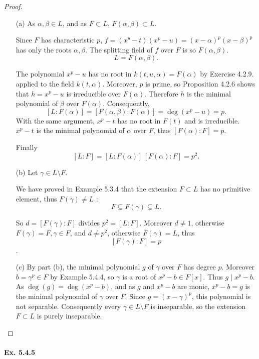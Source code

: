 \documentclass[11pt,a4paper]{article}
\begin{document}
\begin{proof}

\begin{enumerate}
\item[(a)]
As $\alpha,\beta\in L$, and as $F\subset L$, $F(\alpha,\beta)\subset L$.

Since $F$ has characteristic $p$, $f=(x^p-t)(x^p-u)  = (x-\alpha)^p(x-\beta)^p$ has only the roots $\alpha,\beta$. The splitting field of $f$ over $F$ is so $F(\alpha,\beta)$.
$$L = F(\alpha,\beta).$$

The polynomial $x^p -u$ has no root in  $k(t,u,\alpha) = F(\alpha)$ by Exercise 4.2.9. applied to the field $k(t,\alpha)$. Moreover, $p$ is prime, so Proposition 4.2.6 shows that $h=x^p-u$ is irreducible over $F(\alpha)$. Therefore $h$ is the minimal polynomial of $\beta$ over $F(\alpha)$. Consequently, 
 $$[L : F(\alpha)] = [F(\alpha,\beta):F(\alpha)] = \deg(x^p-u) = p.$$
 With the same argument, $x^p - t$ has no root in  $F(t)$ and is irreducible. $x^p-t$ is the minimal polynomial of $\alpha$ over $F$, thus $[F(\alpha):F] = p$.
 
Finally
 $$[L:F] = [L : F(\alpha)]\, [F(\alpha):F] = p^2.$$
 
\item[(b)]
Let $\gamma \in L\setminus F$.

We have proved in Example 5.3.4 that the extension $F \subset L$ has no primitive element, thus $F(\gamma) \neq L$ :
$$F \subsetneq F(\gamma)\subsetneq L.$$

So $d= [F(\gamma) : F]$ divides $p^2 = [L:F]$. Moreover $d\ne 1$, otherwise $F(\gamma) = F, \gamma \in F$, and $d \ne p^2$, otherwise $F(\gamma) = L$, thus
$$[F(\gamma) : F] = p$$.

\item[(c)]
By part (b), the minimal polynomial $g$ of  $\gamma$ over $F$ has degree $p$. Moreover $b = \gamma^p \in F$ by Example 5.4.4, so $\gamma$ is a root of $x^p -b \in F[x]$. Thus $g \mid x^p-b$. As $\deg(g) = \deg(x^p-b)$, and as $g$ and  $x^p-b$ are monic, $x^p-b =g$ is the minimal polynomial of $\gamma$ over $F$. Since $g = (x-\gamma)^p$, this polynomial is not separable. Consequently every $\gamma \in L\setminus F$ is inseparable, so the extension $F \subset L $ is purely inseparable.

\end{enumerate}
\end{proof}

\paragraph{Ex. 5.4.5}
\end{document}
